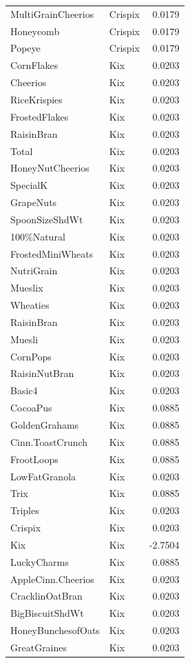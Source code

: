 \begin{longtable}{llr}
MultiGrainCheerios & Crispix & 0.0179 \\
Honeycomb & Crispix & 0.0179 \\
Popeye & Crispix & 0.0179 \\
CornFlakes & Kix & 0.0203 \\
Cheerios & Kix & 0.0203 \\
RiceKrispies & Kix & 0.0203 \\
FrostedFlakes & Kix & 0.0203 \\
RaisinBran & Kix & 0.0203 \\
Total & Kix & 0.0203 \\
HoneyNutCheerios & Kix & 0.0203 \\
SpecialK & Kix & 0.0203 \\
GrapeNuts & Kix & 0.0203 \\
SpoonSizeShdWt & Kix & 0.0203 \\
100\%Natural & Kix & 0.0203 \\
FrostedMiniWheats & Kix & 0.0203 \\
NutriGrain & Kix & 0.0203 \\
Mueslix & Kix & 0.0203 \\
Wheaties & Kix & 0.0203 \\
RaisinBran & Kix & 0.0203 \\
Muesli & Kix & 0.0203 \\
CornPops & Kix & 0.0203 \\
RaisinNutBran & Kix & 0.0203 \\
Basic4 & Kix & 0.0203 \\
CocoaPus & Kix & 0.0885 \\
GoldenGrahams & Kix & 0.0885 \\
Cinn.ToastCrunch & Kix & 0.0885 \\
FrootLoops & Kix & 0.0885 \\
LowFatGranola & Kix & 0.0203 \\
Trix & Kix & 0.0885 \\
Triples & Kix & 0.0203 \\
Crispix & Kix & 0.0203 \\
Kix & Kix & -2.7504 \\
LuckyCharms & Kix & 0.0885 \\
AppleCinn.Cheerios & Kix & 0.0203 \\
CracklinOatBran & Kix & 0.0203 \\
BigBiscuitShdWt & Kix & 0.0203 \\
HoneyBunchesofOats & Kix & 0.0203 \\
GreatGraines & Kix & 0.0203 \\

\end{longtable}

